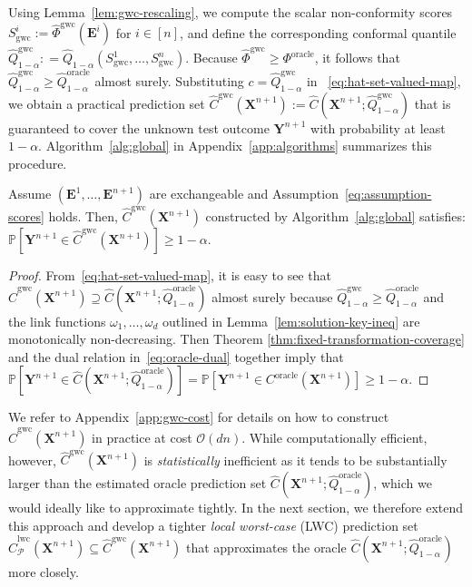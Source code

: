Using Lemma~\ref{lem:gwc-rescaling}, we compute the scalar non-conformity scores $S^i_{\mathrm{gwc}} := \hat{\Phi}^{\mathrm{gwc}}(\mathbf{E}^i)$ for $i \in [n]$, and define the corresponding conformal quantile  $\hat{Q}^{\mathrm{gwc}}_{1-\alpha}: = \hat{Q}_{1-\alpha}(S^1_{\mathrm{gwc}},\ldots, S^n_{\mathrm{gwc}})$.
Because $\hat{\Phi}^{\mathrm{gwc}}\geq \Phi^\mathrm{oracle}$, it follows that 
$\hat{Q}^{\mathrm{gwc}}_{1-\alpha} \geq \hat{Q}^{\mathrm{oracle}}_{1-\alpha}$ almost surely. Substituting $c=\hat{Q}^{\mathrm{gwc}}_{1-\alpha}$ in ~\eqref{eq:hat-set-valued-map}, we obtain a practical prediction set $\hat{C}^{\mathrm{gwc}}(\mathbf{X}^{n+1}):= \hat{C}(\mathbf{X}^{n+1}; \hat{Q}^{\mathrm{gwc}}_{1-\alpha})$ that is guaranteed to cover the unknown test outcome $\mathbf{Y}^{n+1}$ with probability at least $1-\alpha$.
Algorithm~\ref{alg:global} in Appendix~\ref{app:algorithms} summarizes this procedure.
\begin{theorem} \label{thm:TSCP-GWC-coverage}
Assume $(\mathbf{E}^1,\ldots,\mathbf{E}^{n+1})$ are exchangeable and Assumption~\ref{eq:assumption-scores} holds.
Then, $\hat{C}^{\mathrm{gwc}}(\mathbf{X}^{n+1})$ constructed by Algorithm~\ref{alg:global} satisfies: $\mathbb{P}[ \mathbf{Y}^{n+1} \in \hat{C}^{\mathrm{gwc}}(\mathbf{X}^{n+1}) ] \ge 1 - \alpha$.
\end{theorem}

\begin{proof}
From~\eqref{eq:hat-set-valued-map}, it is easy to see that $\hat{C}^{\mathrm{gwc}}(\mathbf{X}^{n+1}) \supseteq \hat{C}(\mathbf{X}^{n+1}; \hat{Q}^{\mathrm{oracle}}_{1-\alpha})$ almost surely because $\hat{Q}^{\mathrm{gwc}}_{1-\alpha} \geq \hat{Q}^{\mathrm{oracle}}_{1-\alpha}$ and the link functions $\omega_1,\ldots,\omega_d$ outlined in Lemma~\ref{lem:solution-key-ineq} are monotonically non-decreasing. Then Theorem \ref{thm:fixed-transformation-coverage} and the dual relation in~\eqref{eq:oracle-dual} together imply that $\mathbb{P}[ \mathbf{Y}^{n+1} \in \hat{C}(\mathbf{X}^{n+1}; \hat{Q}^{\mathrm{oracle}}_{1-\alpha}) ]=\mathbb{P}[ \mathbf{Y}^{n+1} \in {C}^\mathrm{oracle}(\mathbf{X}^{n+1}) ] \ge 1 - \alpha$.
\end{proof}

We refer to Appendix~\ref{app:gwc-cost} for details on how to construct $\hat{C}^{\mathrm{gwc}}(\mathbf{X}^{n+1})$ in practice at cost $\mathcal{O}(dn)$. While computationally efficient, however, $\hat{C}^{\mathrm{gwc}}(\mathbf{X}^{n+1})$ is {\em statistically} inefficient as it tends to be substantially larger than the estimated oracle prediction set $\hat{C}(\mathbf{X}^{n+1}; \hat{Q}^{\mathrm{oracle}}_{1-\alpha})$, which we would ideally like to approximate tightly.
In the next section, we therefore extend this approach and develop a tighter {\em local worst-case} (LWC) prediction set $\hat{C}^{\mathrm{lwc}}_{\mathcal{P}}(\mathbf{X}^{n+1}) \subseteq \hat{C}^\mathrm{gwc}(\mathbf{X}^{n+1})$ that approximates the oracle $\hat{C}(\mathbf{X}^{n+1}; \hat{Q}^{\mathrm{oracle}}_{1-\alpha})$ more closely. 

